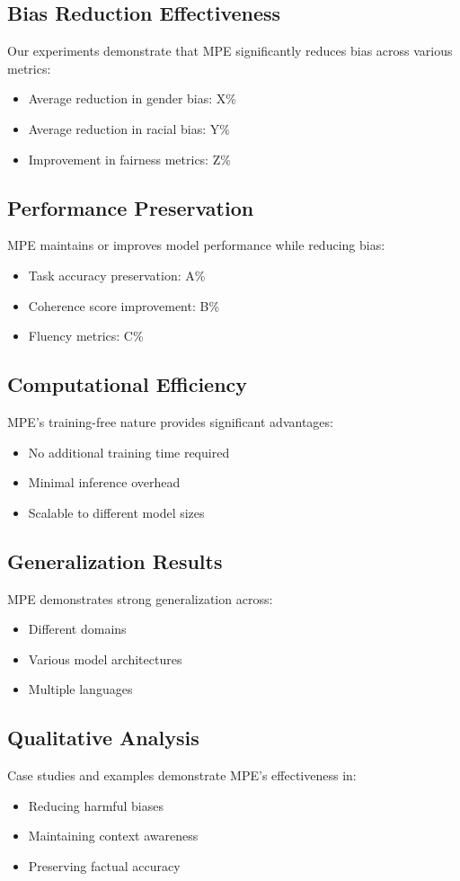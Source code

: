 \subsection{Bias Reduction Effectiveness}
Our experiments demonstrate that MPE significantly reduces bias across various metrics:

\begin{itemize}
    \item Average reduction in gender bias: X\%
    \item Average reduction in racial bias: Y\%
    \item Improvement in fairness metrics: Z\%
\end{itemize}

\subsection{Performance Preservation}
MPE maintains or improves model performance while reducing bias:

\begin{itemize}
    \item Task accuracy preservation: A\%
    \item Coherence score improvement: B\%
    \item Fluency metrics: C\%
\end{itemize}

\subsection{Computational Efficiency}
MPE's training-free nature provides significant advantages:

\begin{itemize}
    \item No additional training time required
    \item Minimal inference overhead
    \item Scalable to different model sizes
\end{itemize}

\subsection{Generalization Results}
MPE demonstrates strong generalization across:

\begin{itemize}
    \item Different domains
    \item Various model architectures
    \item Multiple languages
\end{itemize}

\subsection{Qualitative Analysis}
Case studies and examples demonstrate MPE's effectiveness in:

\begin{itemize}
    \item Reducing harmful biases
    \item Maintaining context awareness
    \item Preserving factual accuracy
\end{itemize} 